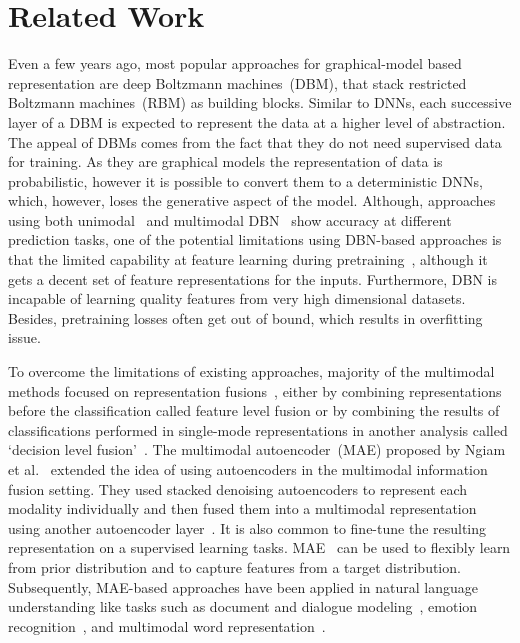 \section{Related Work}\label{chapter_4:rw}
Even a few years ago, most popular approaches for graphical-model based representation are deep Boltzmann machines~(DBM), that stack restricted Boltzmann machines~(RBM) as building blocks. Similar to DNNs, each successive layer of a DBM is expected to represent the data at a higher level of abstraction. The appeal of DBMs comes from the fact that they do not need supervised data for training. As they are graphical models the representation of data is probabilistic, however it is possible to convert them to a deterministic DNNs, which, however, loses the generative aspect of the model. Although, approaches using both unimodal~\cite{abdel2016breast} and multimodal DBN~\cite{liang} show accuracy at different prediction tasks, one of the potential limitations using DBN-based approaches is that the limited capability at feature learning during pretraining~\cite{serban2016multi}, although it gets a decent set of feature representations for the inputs. Furthermore, DBN is incapable of learning quality features from very high dimensional datasets. Besides, pretraining losses often get out of bound, which results in overfitting issue. 

\hspace*{3.5mm} To overcome the limitations of existing approaches, majority of the multimodal methods focused on representation fusions~\cite{ito2018effects}, either by combining representations before the classification called feature level fusion or by combining the results of classifications performed in single-mode representations in another analysis  called `decision level fusion'~\cite{atrey2010multimodal}. 
The multimodal autoencoder~(MAE) proposed by Ngiam et al.~\cite{NgiamKKNLN11} extended the idea of using autoencoders in the multimodal information fusion setting. They used stacked denoising autoencoders to represent each modality individually and then fused them into a multimodal representation using another autoencoder layer~\cite{mmsurvey,serban2016multi}. It is also common to fine-tune the resulting representation on a supervised learning tasks. 
MAE~\cite{liu2016multimodal,serban2016multi,wang2018associativemulti} can be used to flexibly learn from prior distribution and to capture features from a target distribution. Subsequently, MAE-based approaches have been applied in natural language understanding like tasks such as document and dialogue modeling~\cite{serban2016multi}, emotion recognition~\cite{liu2016multimodal}, and multimodal word representation~\cite{wang2018associativemulti}. 

